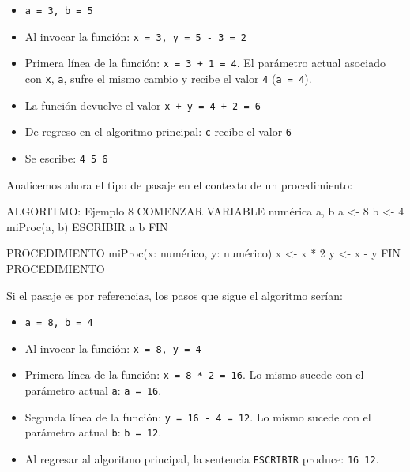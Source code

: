 \documentclass[
]{book}
\newenvironment{Shaded}{\begin{snugshade}}{\end{snugshade}}
\newcommand{\NormalTok}[1]{#1}
\providecommand{\tightlist}{%
  \setlength{\itemsep}{0pt}\setlength{\parskip}{0pt}}
\begin{document}
\begin{itemize}
\tightlist
\item
  \texttt{a\ =\ 3,\ b\ =\ 5}
\item
  Al invocar la función: \texttt{x\ =\ 3,\ y\ =\ 5\ -\ 3\ =\ 2}
\item
  Primera línea de la función: \texttt{x\ =\ 3\ +\ 1\ =\ 4}. El parámetro actual asociado con \texttt{x}, \texttt{a}, sufre el mismo cambio y recibe el valor \texttt{4} (\texttt{a\ =\ 4}).
\item
  La función devuelve el valor \texttt{x\ +\ y\ =\ 4\ +\ 2\ =\ 6}
\item
  De regreso en el algoritmo principal: \texttt{c} recibe el valor \texttt{6}
\item
  Se escribe: \texttt{4\ 5\ 6}
\end{itemize}

Analicemos ahora el tipo de pasaje en el contexto de un procedimiento:

\begin{Shaded}
\begin{Highlighting}[]
\NormalTok{ALGORITMO: Ejemplo 8}
\NormalTok{COMENZAR}
\NormalTok{    VARIABLE numérica a, b}
\NormalTok{    a \textless{}{-} 8}
\NormalTok{    b \textless{}{-} 4}
\NormalTok{    miProc(a, b)}
\NormalTok{    ESCRIBIR a b}
\NormalTok{FIN}

\NormalTok{PROCEDIMIENTO miProc(x: numérico, y: numérico)}
\NormalTok{    x \textless{}{-} x * 2}
\NormalTok{    y \textless{}{-} x {-} y}
\NormalTok{FIN PROCEDIMIENTO}
\end{Highlighting}
\end{Shaded}

Si el pasaje es por referencias, los pasos que sigue el algoritmo serían:

\begin{itemize}
\tightlist
\item
  \texttt{a\ =\ 8,\ b\ =\ 4}
\item
  Al invocar la función: \texttt{x\ =\ 8,\ y\ =\ 4}
\item
  Primera línea de la función: \texttt{x\ =\ 8\ *\ 2\ =\ 16}. Lo mismo sucede con el parámetro actual \texttt{a}: \texttt{a\ =\ 16}.
\item
  Segunda línea de la función: \texttt{y\ =\ 16\ -\ 4\ =\ 12}. Lo mismo sucede con el parámetro actual \texttt{b}: \texttt{b\ =\ 12}.
\item
  Al regresar al algoritmo principal, la sentencia \texttt{ESCRIBIR} produce: \texttt{16\ 12}.
\end{itemize}
\end{document}

